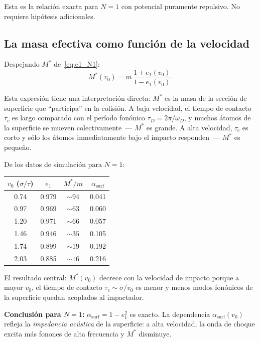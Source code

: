 \documentclass[11pt, a4paper]{article}
\begin{document}
\noindent Esta es la relación exacta para $N=1$ con potencial puramente
repulsivo. No requiere hipótesis adicionales.

\subsection{La masa efectiva como función de la velocidad}

Despejando $M^*$ de~\eqref{eq:e1_N1}:
\begin{equation}
  M^*(v_0) = m\,\frac{1 + e_1(v_0)}{1 - e_1(v_0)}.
  \label{eq:M_eff}
\end{equation}

\noindent Esta expresión tiene una interpretación directa: $M^*$ es la masa de
la sección de superficie que ``participa'' en la colisión. A baja velocidad,
el tiempo de contacto $\tau_c$ es largo comparado con el período fonónico
$\tau_D = 2\pi/\omega_D$, y muchos átomos de la superficie se mueven
colectivamente~--- $M^*$ es grande. A alta velocidad, $\tau_c$ es corto y
sólo los átomos inmediatamente bajo el impacto responden~--- $M^*$ es pequeño.

De los datos de simulación para $N=1$:
\begin{center}
\begin{tabular}{cccc}
  \toprule
  $v_0$ ($\sigma/\tau$) & $e_1$ & $M^*/m$ & $\alpha_\text{surf}$ \\
  \midrule
  0.74 & 0.979 & $\sim 94$ & 0.041 \\
  0.97 & 0.969 & $\sim 63$ & 0.060 \\
  1.20 & 0.971 & $\sim 66$ & 0.057 \\
  1.46 & 0.946 & $\sim 35$ & 0.105 \\
  1.74 & 0.899 & $\sim 19$ & 0.192 \\
  2.03 & 0.885 & $\sim 16$ & 0.216 \\
  \bottomrule
\end{tabular}
\end{center}

\noindent El resultado central: $M^*(v_0)$ decrece con la velocidad de impacto
porque a mayor $v_0$, el tiempo de contacto $\tau_c \sim \sigma/v_0$ es menor
y menos modos fonónicos de la superficie quedan acoplados al impactador.

\begin{mdframed}[style=resultado]
\textbf{Conclusión para $N=1$:} $\alpha_\text{surf} = 1 - e_1^2$ es exacto.
La dependencia $\alpha_\text{surf}(v_0)$ refleja la \emph{impedancia acústica}
de la superficie: a alta velocidad, la onda de choque excita más fonones de
alta frecuencia y $M^*$ disminuye.
\end{mdframed}
\end{document}
